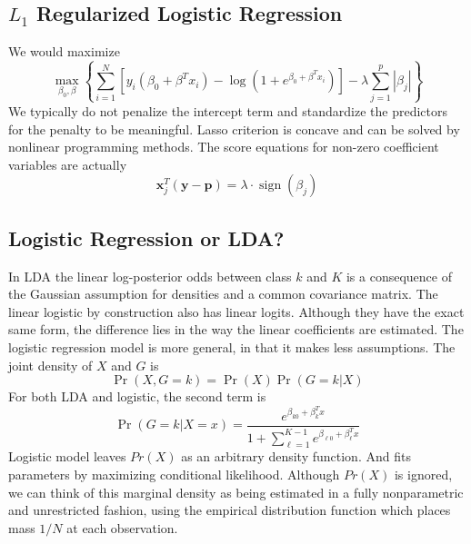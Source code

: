 \subsection{$L_1$ Regularized Logistic Regression}
We would maximize
\begin{equation*}
    \max _{\beta_{0}, \beta}\left\{\sum_{i=1}^{N}\left[y_{i}\left(\beta_{0}+\beta^{T}
     x_{i}\right)-\log \left(1+e^{\beta_{0}+\beta^{T} x_{i}}\right)\right]-\lambda 
     \sum_{j=1}^{p}\left|\beta_{j}\right|\right\}
\end{equation*}
We typically do not penalize the intercept term and standardize the predictors for the 
penalty to be meaningful. Lasso criterion is concave and can be solved by nonlinear
programming methods. The score equations for non-zero coefficient variables are actually
\begin{equation*}
    \mathbf{x}_{j}^{T}(\mathbf{y}-\mathbf{p})=\lambda \cdot \operatorname{sign}\left(\beta_{j}\right)
\end{equation*}

\subsection{Logistic Regression or LDA?}
In LDA the linear log-posterior odds between class $k$ and $K$ is a consequence of the 
Gaussian assumption for densities and a common covariance matrix. The linear logistic
by construction also has linear logits. Although they have the exact same form, 
the difference lies in the way the linear coefficients are estimated. The
logistic regression model is more general, in that it makes less assumptions. 
The joint density of $X$ and $G$ is 
\begin{equation*}
    \operatorname{Pr}(X, G=k)=\operatorname{Pr}(X) \operatorname{Pr}(G=k | X)
\end{equation*}
For both LDA and logistic, the second term is
\begin{equation*}
    \operatorname{Pr}(G=k | X=x)=\frac{e^{\beta_{k 0}+\beta_{k}^{T} x}}
    {1+\sum_{\ell=1}^{K-1} e^{\beta_{\ell 0}+\beta_{\ell}^{T} x}}
\end{equation*}
Logistic model leaves $Pr(X)$ as an arbitrary density function. And fits parameters by
maximizing conditional likelihood. Although $Pr(X)$ is ignored, we can think
of this marginal density as being estimated in a fully nonparametric and
unrestricted fashion, using the empirical distribution function which places
mass $1/N$ at each observation.

